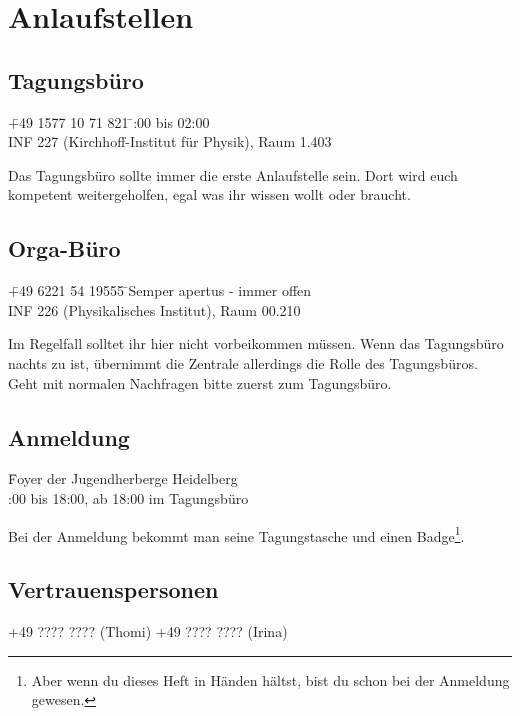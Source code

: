 
\section{Anlaufstellen}

\subsection{Tagungsbüro}
\begin{tabbing}
\faPhone \quad \quad \= +49 1577 10 71 821 \quad \quad \faClockO \= \quad {}:00 bis 02:00 \\ %
\faMapPin \> INF 227 (Kirchhoff-Institut für Physik), Raum 1.403 %
\end{tabbing}

\noindent Das Tagungsbüro sollte immer die erste Anlaufstelle sein. Dort wird euch kompetent weitergeholfen, egal was ihr wissen wollt oder braucht.

\subsection{Orga-Büro}
\begin{tabbing}
\faPhone \quad \quad \= +49 6221 54 19555 \quad \quad \faClockO \= \quad \quad  Semper apertus - immer offen\\
\faMapPin \> INF 226 (Physikalisches Institut), Raum 00.210
\end{tabbing}

\noindent Im Regelfall solltet ihr hier nicht vorbeikommen müssen. Wenn das Tagungsbüro nachts zu ist, übernimmt die Zentrale allerdings die Rolle des Tagungsbüros. Geht mit normalen Nachfragen bitte zuerst zum Tagungsbüro. %

\subsection{Anmeldung}
\begin{tabbing}
\faMapPin \quad \quad \= Foyer der Jugendherberge Heidelberg\\ %
\faClockO {}:00 bis 18:00, ab 18:00 im Tagungsbüro %
\end{tabbing}

\noindent Bei der Anmeldung bekommt man seine Tagungstasche und einen Badge\footnote{Aber wenn du dieses Heft in Händen hältst, bist du schon bei der Anmeldung gewesen.}. %

\subsection{Vertrauenspersonen}
\faPhone \quad \quad +49 ???? ???? (Thomi) \quad \quad +49 ???? ???? (Irina) %

